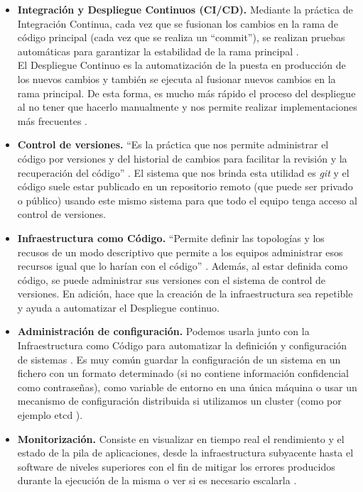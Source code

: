 \begin{itemize}
	\item \textbf{Integración y Despliegue Continuos (CI/CD).} Mediante la práctica de Integración Continua, cada vez que se fusionan los cambios en la rama de código principal (cada vez que se realiza un \enquote{commit}), se realizan pruebas automáticas para garantizar la estabilidad de la rama principal \cite{devops}.\\
	
	El Despliegue Continuo es la automatización de la puesta en producción de los nuevos cambios y también se ejecuta al fusionar nuevos cambios en la rama principal. De esta forma, es mucho más rápido el proceso del despliegue al no tener que hacerlo manualmente y nos permite realizar implementaciones más frecuentes \cite{devops}.
	
	\item \textbf{Control de versiones.} \enquote{Es la práctica que nos permite administrar el código por versiones y del historial de cambios para facilitar la revisión y la recuperación del código} \cite{devops}. El sistema que nos brinda esta utilidad es \textit{git} y el código suele estar publicado en un repositorio remoto (que puede ser privado o público) usando este mismo sistema para que todo el equipo tenga acceso al control de versiones.
	
	\item \textbf{Infraestructura como Código.} \enquote{Permite definir las topologías y los recusos de un modo descriptivo que permite a los equipos administrar esos recursos igual que lo harían con el código} \cite{devops}. Además, al estar definida como código, se puede administrar sus versiones con el sistema de control de versiones. En adición, hace que la creación de la infraestructura sea repetible y ayuda a automatizar el Despliegue continuo.
	
	\item \textbf{Administración de configuración.} Podemos usarla junto con la Infraestructura como Código para automatizar la definición y configuración de sistemas \cite{devops}. Es muy común guardar la configuración de un sistema en un fichero con un formato determinado (si no contiene información confidencial como contraseñas), como variable de entorno en una única máquina o usar un mecanismo de configuración distribuida si utilizamos un cluster (como por ejemplo etcd \cite{etcd}).
	
	\item \textbf{Monitorización.} Consiste en visualizar en tiempo real el rendimiento y el estado de la pila de aplicaciones, desde la infraestructura subyacente hasta el software de niveles superiores con el fin de mitigar los errores producidos durante la ejecución de la misma o ver si es necesario escalarla \cite{devops}.
\end{itemize}

